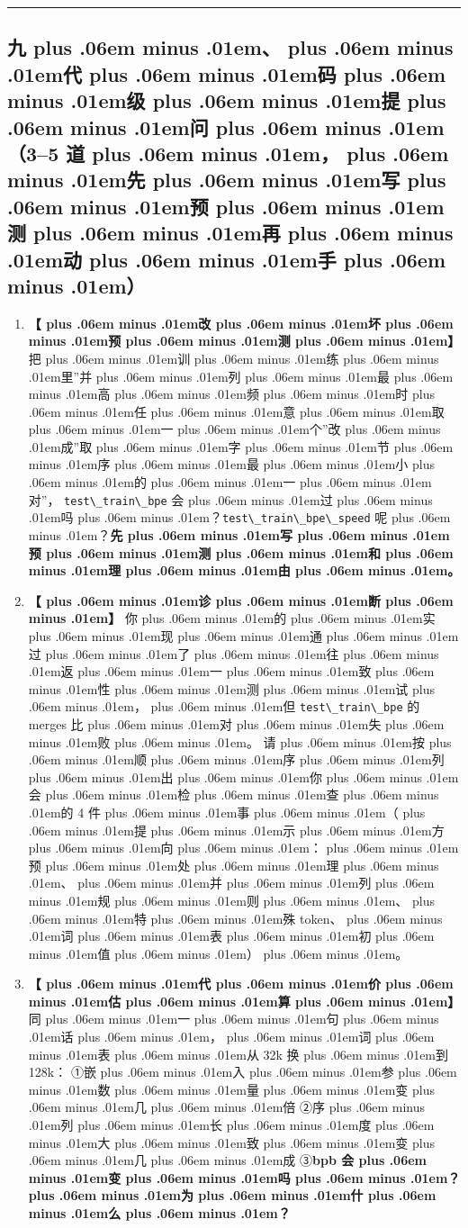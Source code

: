 \documentclass[
]{article}
\newcommand{\passthrough}[1]{#1}
\providecommand{\tightlist}{%
  \setlength{\itemsep}{0pt}\setlength{\parskip}{0pt}}
\def\zh#1{{\zhfont #1}}
\def\sym#1{{\symfont #1}}
\def\zhglue{\hskip0pt plus .06em minus .01em}
\begin{document}
\begin{center}\rule{0.5\linewidth}{0.5pt}\end{center}

\subsection{\zh{九\zhglue 、\zhglue 代\zhglue 码\zhglue 级\zhglue 提\zhglue 问\zhglue （}3--5 \zh{道\zhglue ，\zhglue 先\zhglue 写\zhglue 预\zhglue 测\zhglue 再\zhglue 动\zhglue 手\zhglue ）}}\label{ux4e5dux4ee3ux7801ux7ea7ux63d0ux95ee35-ux9053ux5148ux5199ux9884ux6d4bux518dux52a8ux624b}

\begin{enumerate}
\def\labelenumi{\arabic{enumi}.}
\tightlist
\item
  \textbf{\zh{【\zhglue 改\zhglue 坏\zhglue 预\zhglue 测\zhglue 】}} \zh{把\zhglue 训\zhglue 练\zhglue 里}''\zh{并\zhglue 列\zhglue 最\zhglue 高\zhglue 频\zhglue 时\zhglue 任\zhglue 意\zhglue 取\zhglue 一\zhglue 个}''\zh{改\zhglue 成}''\zh{取\zhglue 字\zhglue 节\zhglue 序\zhglue 最\zhglue 小\zhglue 的\zhglue 一\zhglue 对}''\zh{，} \passthrough{\lstinline!test\_train\_bpe!} \zh{会\zhglue 过\zhglue 吗\zhglue ？}\passthrough{\lstinline!test\_train\_bpe\_speed!} \zh{呢\zhglue ？}\textbf{\zh{先\zhglue 写\zhglue 预\zhglue 测\zhglue 和\zhglue 理\zhglue 由\zhglue 。}}
\item
  \textbf{\zh{【\zhglue 诊\zhglue 断\zhglue 】}} \zh{你\zhglue 的\zhglue 实\zhglue 现\zhglue 通\zhglue 过\zhglue 了\zhglue 往\zhglue 返\zhglue 一\zhglue 致\zhglue 性\zhglue 测\zhglue 试\zhglue ，\zhglue 但} \passthrough{\lstinline!test\_train\_bpe!} \zh{的} merges \zh{比\zhglue 对\zhglue 失\zhglue 败\zhglue 。} \zh{请\zhglue 按\zhglue 顺\zhglue 序\zhglue 列\zhglue 出\zhglue 你\zhglue 会\zhglue 检\zhglue 查\zhglue 的} 4 \zh{件\zhglue 事\zhglue （\zhglue 提\zhglue 示\zhglue 方\zhglue 向\zhglue ：\zhglue 预\zhglue 处\zhglue 理\zhglue 、\zhglue 并\zhglue 列\zhglue 规\zhglue 则\zhglue 、\zhglue 特\zhglue 殊} token\zh{、\zhglue 词\zhglue 表\zhglue 初\zhglue 值\zhglue ）\zhglue 。}
\item
  \textbf{\zh{【\zhglue 代\zhglue 价\zhglue 估\zhglue 算\zhglue 】}} \zh{同\zhglue 一\zhglue 句\zhglue 话\zhglue ，\zhglue 词\zhglue 表\zhglue 从} 32k \zh{换\zhglue 到} 128k\zh{：} \sym{①}\zh{嵌\zhglue 入\zhglue 参\zhglue 数\zhglue 量\zhglue 变\zhglue 几\zhglue 倍} \sym{②}\zh{序\zhglue 列\zhglue 长\zhglue 度\zhglue 大\zhglue 致\zhglue 变\zhglue 几\zhglue 成} \sym{③}\textbf{bpb \zh{会\zhglue 变\zhglue 吗\zhglue ？\zhglue 为\zhglue 什\zhglue 么\zhglue ？}}

\end{enumerate}
\end{document}
